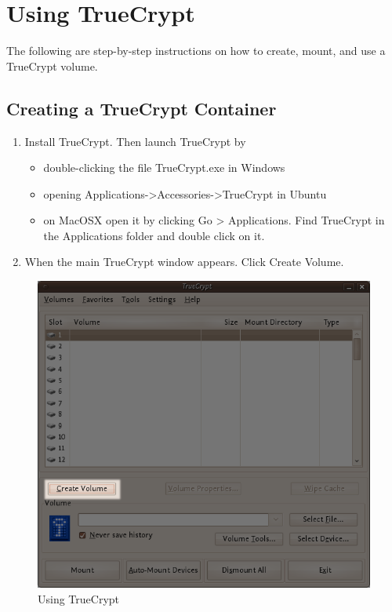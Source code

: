 \section{Using TrueCrypt}

The following are step-by-step instructions on how to create, mount, and
use a TrueCrypt volume.

\subsection{Creating a TrueCrypt Container}

\begin{enumerate}[1.]
\item
  Install TrueCrypt. Then launch TrueCrypt by

  \begin{itemize}
  \item
    double-clicking the file TrueCrypt.exe in Windows
  \item
    opening
    Applications-\textgreater{}Accessories-\textgreater{}TrueCrypt in
    Ubuntu
  \item
    on MacOSX open it by clicking Go \textgreater{} Applications. Find
    TrueCrypt in the Applications folder and double click on it.
  \end{itemize}
\item
  When the main TrueCrypt window appears. Click Create Volume.
\end{enumerate}
\begin{figure}[htbp]
\centering
\includegraphics{using_tc_001.png}
\caption{Using TrueCrypt}
\end{figure}

